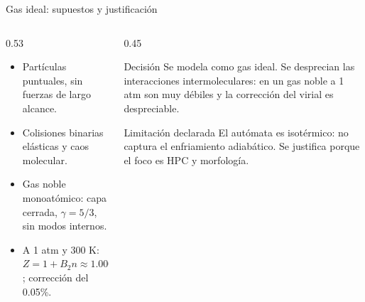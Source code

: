 \documentclass[aspectratio=169]{beamer}
\begin{document}
\begin{frame}{Gas ideal: supuestos y justificación}
  \begin{columns}[T]
    \begin{column}{0.53\textwidth}
      \begin{itemize}
        \item Partículas puntuales, sin fuerzas de largo alcance.
        \item Colisiones binarias elásticas y caos molecular.
        \item Gas noble monoatómico: capa cerrada, $\gamma=5/3$, sin modos
              internos.
        \item A 1 atm y 300 K:
              $Z=1+B_2 n\approx 1.00046$; corrección del \alert{0.05\%}.
      \end{itemize}
    \end{column}
    \begin{column}{0.45\textwidth}
      \begin{block}{Decisión}
        \footnotesize
        Se modela como \alert{gas ideal}. Se desprecian las interacciones
        intermoleculares: en un gas noble a 1 atm son muy débiles y la
        corrección del virial es despreciable.
      \end{block}
      \begin{alertblock}{Limitación declarada}
        \footnotesize
        El autómata es \alert{isotérmico}: no captura el enfriamiento
        adiabático. Se justifica porque el foco es HPC y morfología.
      \end{alertblock}
    \end{column}
  \end{columns}
\end{frame}
\end{document}
